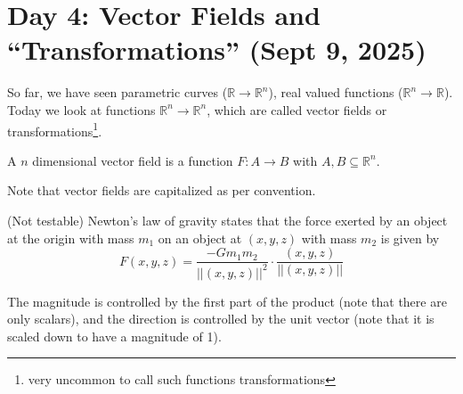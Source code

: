 \section{Day 4: Vector Fields and ``Transformations'' (Sept 9, 2025)}

So far, we have seen parametric curves ($\mathbb{R} \to \mathbb{R}^n$), real valued functions ($\mathbb{R}^n \to \mathbb{R}$). Today we look at functions $\mathbb{R}^n \to \mathbb{R}^n$, which are called vector fields or transformations\footnote{very uncommon to call such functions transformations}.

\begin{definition}
A $n$ dimensional vector field is a function $F: A \to B$ with $A, B \subseteq \mathbb{R}^n$.
\end{definition}

Note that vector fields are capitalized as per convention. 

(Not testable) Newton's law of gravity states that the force exerted by an object at the origin with mass $m_1$ on an object at $(x, y, z)$ with mass $m_2$ is given by
\[
F(x, y, z) = \frac{-Gm_1m_2}{||(x,y,z)||^2} \cdot \frac{(x, y, z)}{||(x, y, z)||}
\]

The magnitude is controlled by the first part of the product (note that there are only scalars), and the direction is controlled by the unit vector (note that it is scaled down to have a magnitude of 1).
